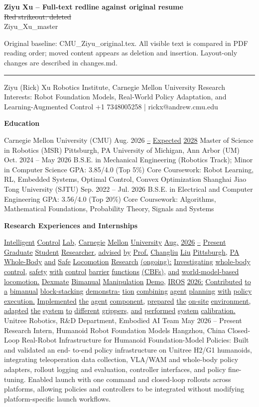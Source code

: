 \documentclass[10pt,letterpaper]{article}
\newcommand{\del}[1]{{\color{red}\sout{#1}}}
\newcommand{\add}[1]{{\color{blue}\uline{#1}}}
\begin{document}
\textbf{Ziyu Xu -- Full-text redline against original resume}\\
\del{Red strikeout: deleted} \quad \add{Blue underline: added}\\
Ziyu\_Xu\_master\par
Original baseline: CMU\_Ziyu\_original.tex. All visible text is compared in PDF reading order; moved content appears as deletion and insertion. Layout-only changes are described in changes.md.
\hrule\medskip
Ziyu (Rick) Xu Robotics Institute, Carnegie Mellon University Research Interests: Robot Foundation Models, Real-World Policy Adaptation, and Learning-Augmented Control +1 7348005258 | rickx@andrew.cmu.edu \par\medskip\textbf{Education}\par  Carnegie Mellon University (CMU) Aug. 2026 \add{--} \add{Expected} \add{2028} Master of Science in Robotics (MSR) Pittsburgh, PA University of Michigan, Ann Arbor (UM) Oct. 2024 -- May 2026 B.S.E. in Mechanical Engineering (Robotics Track); Minor in Computer Science GPA: 3.85/4.0 (Top 5\%)  Core Coursework: Robot Learning, RL, Embedded Systems, Optimal Control, Convex Optimization Shanghai Jiao Tong University (SJTU) Sep. 2022 -- Jul. 2026 B.S.E. in Electrical and Computer Engineering GPA: 3.56/4.0 (Top 20\%)  Core Coursework: Algorithms, Mathematical Foundations, Probability Theory, Signals and Systems \par\medskip\textbf{Research Experiences and Internships}\par  \add{Intelligent} \add{Control} \add{Lab,} \add{Carnegie} \add{Mellon} \add{University} \add{Aug.} \add{2026} \add{--} \add{Present} \add{Graduate} \add{Student} \add{Researcher,} \add{advised} \add{by} \add{Prof.} \add{Changliu} \add{Liu} \add{Pittsburgh,} \add{PA} \add{} \add{Whole-Body} \add{and} \add{Safe} \add{Locomotion} \add{Research} \add{(ongoing):} \add{Investigating} \add{whole-body} \add{control,} \add{safety} \add{with} \add{control} \add{barrier} \add{functions} \add{(CBFs),} \add{and} \add{world-model-based} \add{locomotion.} \add{} \add{Dexmate} \add{Bimanual} \add{Manipulation} \add{Demo,} \add{IROS} \add{2026:} \add{Contributed} \add{to} \add{a} \add{bimanual} \add{block-stacking} \add{demonstra-} \add{tion} \add{combining} \add{agent} \add{planning} \add{with} \add{policy} \add{execution.} \add{Implemented} \add{the} \add{agent} \add{component,} \add{prepared} \add{the} \add{on-site} \add{environment,} \add{adapted} \add{the} \add{system} \add{to} \add{different} \add{grippers,} \add{and} \add{performed} \add{system} \add{calibration.} Unitree Robotics, R\&D Department, Embodied AI Team May 2026 -- Present Research Intern, Humanoid Robot Foundation Models Hangzhou, China  Closed-Loop Real-Robot Infrastructure for Humanoid Foundation-Model Policies: Built and validated an end- to-end policy infrastructure on Unitree H2/G1 humanoids, integrating teleoperation data collection, VLA/WAM and whole-body policy adapters, rollout logging and evaluation, controller interfaces, and policy fine-tuning. Enabled launch with one command and closed-loop rollouts across platforms, allowing policies and controllers to be integrated without modifying platform-specific launch workflows.  
\end{document}
